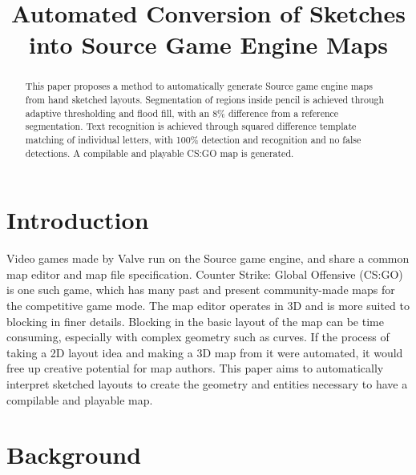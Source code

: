 \documentclass[conference]{IEEEtran}
\begin{document}
\title{Automated Conversion of Sketches into Source Game Engine Maps}
\author{
\and
{}
}

 \maketitle
 
\begin{abstract}
This paper proposes a method to automatically generate Source game engine maps from hand sketched layouts. Segmentation of regions inside pencil is achieved through adaptive thresholding and flood fill, with an 8\% difference from a reference segmentation. Text recognition is achieved through squared difference template matching of individual letters, with 100\% detection and recognition and no false detections. A compilable and playable CS:GO map is generated.
\end{abstract}

\section{Introduction}

Video games made by Valve run on the Source game engine, and share a common map editor and map file specification. Counter Strike: Global Offensive (CS:GO) is one such game, which has many past and present community-made maps for the competitive game mode. The map editor operates in 3D and is more suited to blocking in finer details. Blocking in the basic layout of the map can be time consuming, especially with complex geometry such as curves. If the process of taking a 2D layout idea and making a 3D map from it were automated, it would free up creative potential for map authors. This paper aims to automatically interpret sketched layouts to create the geometry and entities necessary to have a compilable and playable map.

\section{Background}
\end{document}
